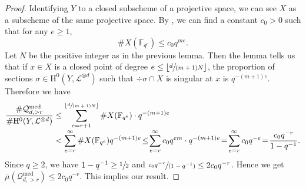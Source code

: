 \documentclass[JEP,XML,SOM,Unicode,published]{cedram}
\newcommand{\spfrac}[2]{\sfrac{#1}{(#2)}}
\theoremstyle{plain}
\theoremstyle{definition}
\newcommand{\ho}{\mathrm{H}}
\newcommand{\li}{\mathcal{L}}
\newcommand{\F}{\mathbb{F}}
\begin{document}
\begin{proof}
Identifying $Y$ to a closed subscheme of a projective space, we can see $X$ as a subscheme of the same projective space. By \cite{LW54}, we can find a constant $c_0>0$ such that for any $e\geq 1$,\vspace*{-3pt}
\[
\#X(\F_{q^e})\leq c_0 q^{me}.
\]
Let $N$ be the positive integer as in the previous lemma. Then the lemma tells us that if $x\in X$ is a closed point of degree $e\leq \lfloor \sfrac{d}{(m+1)N}\rfloor$, the proportion of sections $\sigma\in \ho^0(Y, \li^{\otimes d})$ such that $\div \sigma\cap X$ is singular at $x$ is $q^{-(m+1)e}$. Therefore we have\vspace*{-3pt}
\begin{align*}
\frac{\#\mathcal{Q}_{d, >r}^{\mathrm{med}}}{\# \ho^0(Y, \mathcal{L}^{\otimes d})}
&\leq \sum_{e=r+1}^{\lfloor\sfrac{d}{(m+1)N}\rfloor}\#X(\mathbb{F}_{q^e})\cdot q^{-(m+1)e} \\[-3pt]
&< \sum_{e=r}^{\infty}\#X(\mathbb{F}_{q^e})q^{-(m+1)e} \!\leq\! \sum_{e=r}^{\infty}c_0q^{em}\cdot q^{-(m+1)e}\!=\!\sum_{e=r}^{\infty}c_0q^{-e}\!=\!\frac{c_0q^{-r}}{1-q^{-1}}.
\end{align*}
Since $q\geq 2$, we have $1-q^{-1}\geq \sfrac{1}{2}$ and $\spfrac{c_0q^{-r}}{1-q^{-1}}\leq 2c_0q^{-r}$. Hence we get $\overline{\mu}(\mathcal{Q}_{d, >r}^{\mathrm{med}})\leq 2c_0q^{-r}$. This implies our result.
\end{proof}

\end{document}
